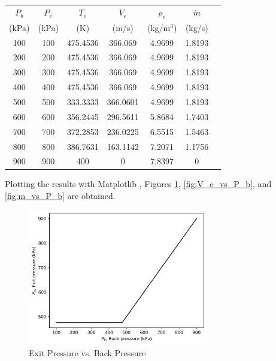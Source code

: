 \begin{table}[H]
    \centering
    \begin{tabular}{ccccccc}
        \toprule
        $P_b$ & $P_e$ & $T_e$ & $V_e$ & $\rho_e$ & $\dot{m}$ \\
        (kPa) & (kPa) & (K) & (m/s) & (kg/m$^3$) & (kg/s) \\
        \midrule
        100 & 100 & 475.4536 & 366.069 & 4.9699 & 1.8193 \\
        200 & 200 & 475.4536 & 366.069 & 4.9699 & 1.8193 \\
        300 & 300 & 475.4536 & 366.069 & 4.9699 & 1.8193 \\
        400 & 400 & 475.4536 & 366.069 & 4.9699 & 1.8193 \\
        500 & 500 & 333.3333 & 366.0601 & 4.9699 & 1.8193 \\
        600 & 600 & 356.2445 & 296.5611 & 5.8684 & 1.7403 \\
        700 & 700 & 372.2853 & 236.0225 & 6.5515 & 1.5463 \\
        800 & 800 & 386.7631 & 163.1142 & 7.2071 & 1.1756 \\
        900 & 900 & 400 & 0 & 7.8397 & 0 \\
        \bottomrule
    \end{tabular}
\end{table}
Plotting the results with Matplotlib \cite{matplotlib}, Figures \ref{fig:P_e_vs_P_b}, \ref{fig:V_e_vs_P_b}, and \ref{fig:m_vs_P_b} are obtained.
\begin{figure}[H]
    \centering
    \includegraphics[width=0.7\textwidth]{Questions/Figures/P_e_vs_P_b.png}
    \caption{Exit Pressure vs. Back Pressure}
    \label{fig:P_e_vs_P_b}
\end{figure}
